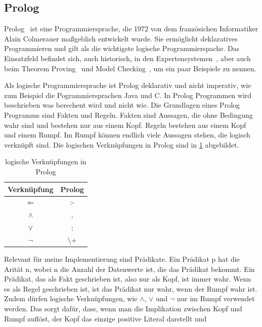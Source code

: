 \subsection{Prolog} \label{sec:prolog}
Prolog~\cite{Colmerauer1993TheBO} ist eine Programmiersprache, die 1972 von dem französichen Informatiker Alain Colmerauer maßgeblich entwickelt wurde.
Sie ermöglicht deklaratives Programmieren und gilt als die wichtigste logische Programmierspache.
Das Einsatzfeld befindet sich, auch historisch, in den Expertensystemen~\cite{merritt2012building}, aber auch
beim Theorem Proving~\cite{zombori2020prolog} und Model Checking~\cite{sridhar2010actionscript}, um ein paar
Beispiele zu nennen.

Als logische Programmiersprache ist Prolog deklarativ und nicht imperativ, wie zum Beispiel die Pogrammiersprachen Java und C.
In Prolog Programmen wird beschrieben was berechent wird und nicht wie.
Die Grundlagen eines Prolog Programms sind Fakten und Regeln.
Fakten sind Aussagen, die ohne Bedingung wahr sind und bestehen nur aus einem Kopf. Regeln bestehen aus einem Kopf und einem Rumpf.
Im Rumpf können endlich viele Aussagen stehen, die logisch verknüpft sind.
Die logischen Verknüpfungen in Prolog sind in \cref{table:logic} abgebildet.
\begin{table}[ht]
  \begin{center}
    \caption{logische Verknüpfungen in Prolog}
    \label{table:logic}
    \begin{tabular}{cc}
      \toprule
      Verknüpfung   & Prolog \\
      \midrule
      \(\Leftarrow\)      &  :-    \\
      \(\wedge\)         &  ,    \\
      \(\vee\)         &  ;    \\
      \(\neg\)         &  \textbackslash+    \\
      \bottomrule
    \end{tabular}
  \end{center}
\end{table}
Relevant für meine Implementierung sind Prädikate. Ein Prädikat p hat die Arität n, wobei n die Anzahl der Datenwerte ist,
die das Prädikat bekommt. Ein Prädikat, das als Fakt geschrieben ist, also nur als Kopf, ist immer wahr.
Wenn es als Regel geschrieben ist, ist das Prädikat nur wahr, wenn der Rumpf wahr ist.
Zudem dürfen logische Verknüpfungen, wie \(\wedge\), \(\vee\) und \(\neg\) nur im Rumpf verwendet werden.
Das sorgt dafür, dass, wenn man die Implikation zwischen Kopf und Rumpf auflöst, der Kopf das einzige positive Literal darstellt und
